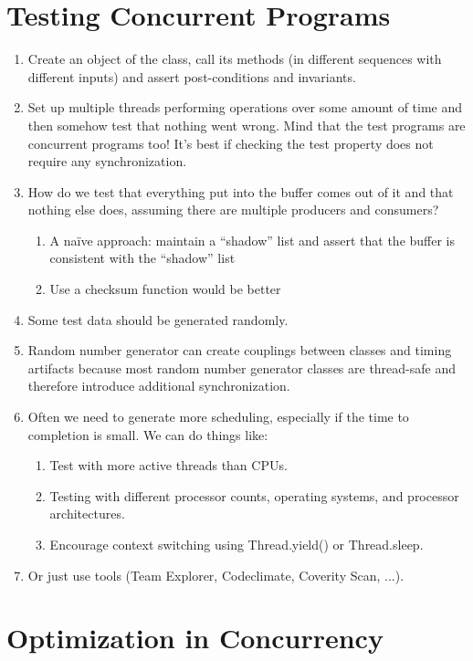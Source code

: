\documentclass{article}
\begin{document}
\section{Testing Concurrent Programs}
\begin{enumerate}
    \item Create an object of the class, call its methods (in different sequences with different inputs) and assert post-conditions and invariants. 
    \item Set up multiple threads performing operations over some amount of time and then somehow test that nothing went wrong. Mind that the test programs are concurrent programs too! It’s best if checking the test property does not require any synchronization.
    \item How do we test that everything put into the buffer comes out of it and that nothing else does, assuming there are multiple producers and consumers?
    \begin{enumerate}
        \item A naïve approach: maintain a ``shadow'' list and assert that the buffer is consistent with the ``shadow'' list
        \item Use a checksum function would be better
    \end{enumerate}
    \item Some test data should be generated randomly.
    \item Random number generator can create couplings between classes and timing artifacts because most random number generator classes are thread-safe and therefore introduce additional synchronization.
    \item Often we need to generate more scheduling, especially if the time to completion is small. We can do things like:
        \begin{enumerate}
            \item Test with more active threads than CPUs.
            \item Testing with different processor counts, operating systems, and processor architectures.
            \item Encourage context switching using Thread.yield() or Thread.sleep.
        \end{enumerate}
    \item Or just use tools (Team Explorer, Codeclimate, Coverity Scan, ...).
\end{enumerate}

\section{Optimization in Concurrency}
\end{document}
